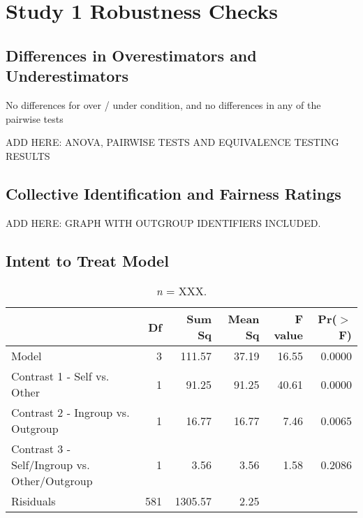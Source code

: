 \documentclass[12pt,]{article}
\begin{document}
\clearpage
\section{Study 1 Robustness Checks}
\label{appendix:study1_robust}


\subsection{Differences in Overestimators and Underestimators}
\label{appendix:over_under1}

No differences for over / under condition, and no differences in any of the pairwise tests 

ADD HERE: ANOVA, PAIRWISE TESTS AND EQUIVALENCE TESTING RESULTS 




\clearpage
\subsection{Collective Identification and Fairness Ratings}
\label{appendix:CID1}

ADD HERE: GRAPH WITH OUTGROUP IDENTIFIERS INCLUDED.  




\clearpage
\subsection{Intent to Treat Model}
\label{appendix:itt1}

\begin{table}[ht]
\centering
\begin{tabular}{lrrrrr}
  \hline
 & Df & Sum Sq & Mean Sq & F value & Pr($>$F) \\ 
  \hline
Model & 3 & 111.57 & 37.19 & 16.55 & 0.0000 \\ 
  Contrast 1 - Self vs. Other & 1 & 91.25 & 91.25 & 40.61 & 0.0000 \\ 
  Contrast 2 - Ingroup vs. Outgroup & 1 & 16.77 & 16.77 & 7.46 & 0.0065 \\ 
  Contrast 3 - Self/Ingroup vs. Other/Outgroup & 1 & 3.56 & 3.56 & 1.58 & 0.2086 \\ 
  Risiduals & 581 & 1305.57 & 2.25 &  &  \\ 
   \hline
\end{tabular}
\caption{{\color{red}{INCOMPLETE: Intent-to-treat model}} \emph{n} = XXX. } 
\label{ITT1}
\end{table}
\end{document}
